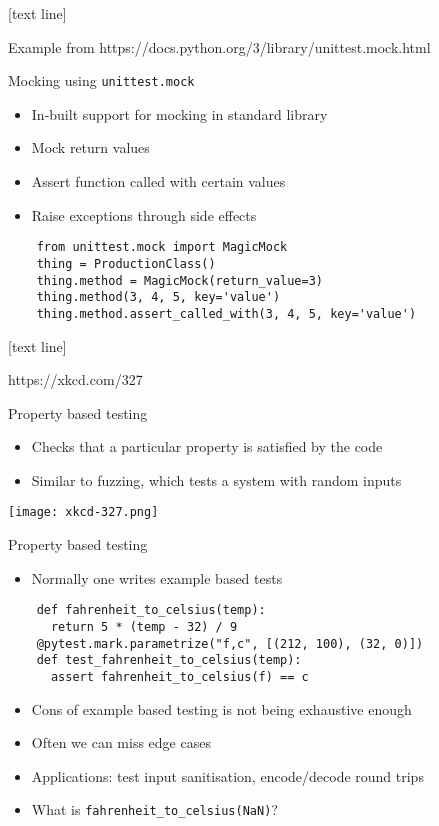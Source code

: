 \documentclass[11pt,xcolor={dvipsnames},hyperref={pdftex,pdfpagemode=UseNone,hidelinks,pdfdisplaydoctitle=true},usepdftitle=false]{beamer}
\newcommand{\footer}[1]{\parbox{\linewidth}{\vspace*{-8pt}#1\hfill\insertpagenumber}}
\begin{document}
{
[text line]{%
\parbox{\linewidth}{\vspace*{-8pt}Example from https://docs.python.org/3/library/unittest.mock.html\hfill\insertpagenumber}}

\begin{frame}[fragile]{Mocking using \texttt{unittest.mock}}
\begin{itemize}
  \item In-built support for mocking in standard library
  \item Mock return values
  \item Assert function called with certain values
  \item Raise exceptions through side effects
\end{itemize}
\vskip 0.5cm
\begin{verbatim}
    from unittest.mock import MagicMock
    thing = ProductionClass()
    thing.method = MagicMock(return_value=3)
    thing.method(3, 4, 5, key='value')
    thing.method.assert_called_with(3, 4, 5, key='value')
\end{verbatim}
\end{frame}
}
{
[text line]{\footer{https://xkcd.com/327}}
\begin{frame}{Property based testing}
  \begin{itemize}
    \item
  Checks that a particular property is satisfied by the code
  \item
  Similar to fuzzing, which tests a system with random inputs
  \end{itemize}
  \vskip 0.7cm
  \texttt{[image: xkcd-327.png]}
\end{frame}
}
\begin{frame}[fragile]{Property based testing}
\label{property-based-testing}
\begin{itemize}
\item
  Normally one writes example based tests
\end{itemize}

\begin{verbatim}
    def fahrenheit_to_celsius(temp):
      return 5 * (temp - 32) / 9
    @pytest.mark.parametrize("f,c", [(212, 100), (32, 0)])
    def test_fahrenheit_to_celsius(temp):
      assert fahrenheit_to_celsius(f) == c
\end{verbatim}

\begin{itemize}
\item
  Cons of example based testing is not being exhaustive enough
\item
  Often we can miss edge cases
\item
  Applications: test input sanitisation, encode/decode round trips
\item
  What is \texttt{fahrenheit\_to\_celsius(NaN)}?
\end{itemize}
\end{frame}
\end{document}

